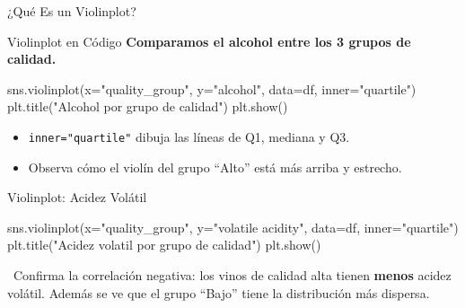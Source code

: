 \documentclass[aspectratio=169, 11pt]{beamer}
\begin{document}
\begin{frame}[shrink=18]{¿Qué Es un Violinplot?}
\begin{center}
  \end{center}
\end{frame}

\begin{frame}[fragile,shrink=28]{Violinplot en Código}
  \vspace{-6pt}
  {\footnotesize\color{arcaDark}\bfseries
    Comparamos el alcohol entre los 3 grupos de calidad.}

  \vspace{4pt}
  \begin{pyblock}
sns.violinplot(x="quality_group", y="alcohol",
               data=df, inner="quartile")
plt.title("Alcohol por grupo de calidad")
plt.show()
  \end{pyblock}

  \vspace{4pt}
  {\scriptsize\color{textMuted}
  \begin{itemize}\setlength{\itemsep}{3pt}
    \item[{\color{arcaRed}\scriptsize\faArrowRight}]
      \texttt{inner="quartile"} dibuja las líneas de Q1, mediana y Q3.
    \item[{\color{codeGreen}\scriptsize\faArrowRight}]
      Observa cómo el violín del grupo ``Alto'' está más arriba y estrecho.
  \end{itemize}
  }
\end{frame}

\begin{frame}[fragile,shrink=28]{Violinplot: Acidez Volátil}
  \vspace{-6pt}
  \begin{pyblock}
sns.violinplot(x="quality_group",
               y="volatile acidity",
               data=df, inner="quartile")
plt.title("Acidez volatil por grupo de calidad")
plt.show()
  \end{pyblock}

  \vspace{4pt}
  {\scriptsize\color{textMuted}
    \faLightbulb\ Confirma la correlación negativa: los vinos de calidad alta
    tienen \textbf{menos} acidez volátil.
    Además se ve que el grupo ``Bajo'' tiene la distribución más dispersa.}
\end{frame}
\end{document}

